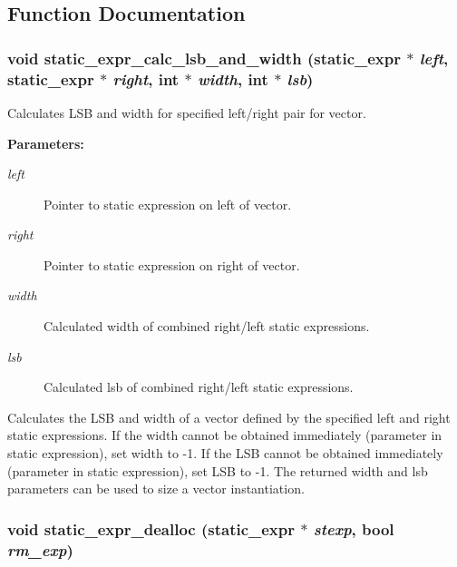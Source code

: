 \subsection{Function Documentation}
\subsubsection{\setlength{\rightskip}{0pt plus 5cm}void static\_\-expr\_\-calc\_\-lsb\_\-and\_\-width ({\bf static\_\-expr} $\ast$ {\em left}, {\bf static\_\-expr} $\ast$ {\em right}, int $\ast$ {\em width}, int $\ast$ {\em lsb})}\label{static_8c_a2}


Calculates LSB and width for specified left/right pair for vector.

\begin{Desc}
\item[{\bf Parameters: }]\par
\begin{description}
\item[
{\em left}]Pointer to static expression on left of vector. \item[
{\em right}]Pointer to static expression on right of vector. \item[
{\em width}]Calculated width of combined right/left static expressions. \item[
{\em lsb}]Calculated lsb of combined right/left static expressions.

\end{description}
\end{Desc}
Calculates the LSB and width of a vector defined by the specified left and right static expressions. If the width cannot be obtained immediately (parameter in static expression), set width to -1. If the LSB cannot be obtained immediately (parameter in static expression), set LSB to -1. The returned width and lsb parameters can be used to size a vector instantiation. 
\subsubsection{\setlength{\rightskip}{0pt plus 5cm}void static\_\-expr\_\-dealloc ({\bf static\_\-expr} $\ast$ {\em stexp}, {\bf bool} {\em rm\_\-exp})}\label{static_8c_a3}


